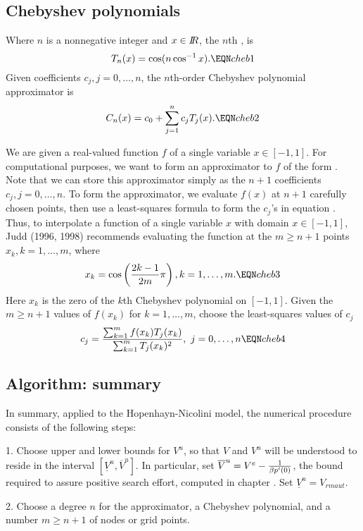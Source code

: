 \subsection{Chebyshev polynomials}
 Where $n$ is a nonnegative  integer and $x \in {I\kern-0.3em R}$,
 the $n$th , is
$$ T_n(x) = \cos(n \cos^{-1} x). \EQN cheb1 $$
Given coefficients $c_j, j = 0, \ldots, n$,
 the $n$th-order Chebyshev polynomial approximator is
$$ C_n(x) =  c_0 + \sum_{j=1}^n c_j T_j(x). \EQN cheb2 $$

We are given a real-valued function $f$ of a single variable
 $x \in [-1, 1]$. For computational purposes,
we want to form an approximator to $f$ of the form .
Note that we can store  this approximator simply as
the $n+1$ coefficients  $c_j, j= 0, \ldots , n$.
To form the approximator, we evaluate $f(x)$ at
$n+1$ carefully chosen points, then use a least-squares formula
to form the $c_j$'s   in   equation .
Thus, to interpolate a function of a single variable   $x$ with domain
$x \in [-1, 1]$,  Judd (1996, 1998) recommends  evaluating
the function at the $m \geq n+1$ points $x_k, k= 1, \ldots, m$,
where
$$ x_k = \cos\left({2 k - 1 \over 2 m } \pi\right) , k=1, \ldots , m .
        \EQN cheb3 $$
Here $x_k$ is the zero of the $k$th Chebyshev polynomial
on $[-1, 1]$.
Given the $m \geq   n+1 $ values of     $f(x_k)$ for $k= 1, \ldots , m$,
choose the least-squares values of $c_j$
$$ c_j = { \sum_{k=1}^m f(x_k) T_j(x_k) \over
 \sum_{k=1}^m T_j(x_k)^2  }, \ j= 0, \ldots , n  \EQN cheb4 $$

\subsection{Algorithm: summary}\label{HNalgorithm}%
In summary, applied to the
Hopenhayn-Nicolini model, the numerical procedure consists of the following steps:
\medskip

\item{1.}  Choose upper and lower bounds for $V^u$, so
that $V$ and $V^u$ will be understood to
reside in the interval $[\underline V^u, \overline V^u]$.  In particular,
set $\overline V^u = V^e - {1 \over
\beta p'(0) }$, the bound required to
assure positive search effort,  computed in chapter .
Set $\underline V^u = V_{rm aut}$.


\item{2.}  Choose a degree $n$ for the approximator, a Chebyshev polynomial,
and a  number $m \geq n+1$ of nodes or grid points.

